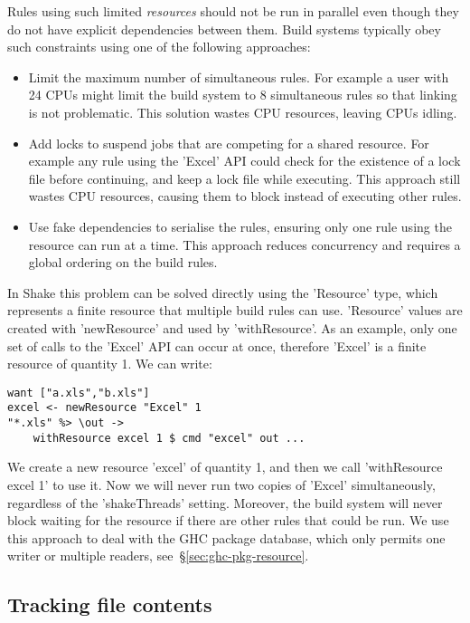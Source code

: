 \noindent Rules using such limited \emph{resources} should not be run in
parallel even though they do not have explicit dependencies between them. Build systems
typically obey such constraints using one of the following approaches:

\begin{itemize}
\item Limit the maximum number of simultaneous rules. For example a user with
24 CPUs might limit the build system to 8 simultaneous rules so that linking is
not problematic. This solution wastes CPU resources, leaving CPUs idling.
\item Add locks to suspend jobs that are competing for a shared resource. For
example any rule using the \lst'Excel' API could check for the existence of a lock
file before continuing, and keep a lock file while executing. This approach
still wastes CPU resources, causing them to block instead of executing other
rules.
\item Use fake dependencies to serialise the rules, ensuring
only one rule using the resource can run at a time. This approach reduces
concurrency and requires a global ordering on the build rules.
\end{itemize}

In Shake this problem can be solved directly using the \lst'Resource' type,
which represents a finite resource that multiple build rules can use. \lst'Resource'
values are created with \lst'newResource' and used by \lst'withResource'. As an
example, only one set of calls to the \lst'Excel' API can occur at once, therefore
\lst'Excel' is a finite resource of quantity 1. We can write:

\begin{lstlisting}
want ["a.xls","b.xls"]
excel <- newResource "Excel" 1
"*.xls" %> \out ->
    withResource excel 1 $ cmd "excel" out ...
\end{lstlisting}

\noindent We create a new resource \lst'excel' of quantity 1, and then we call
\lst'withResource excel 1' to use it. Now we will never run two copies of
\lst'Excel' simultaneously, regardless of the \lst'shakeThreads' setting.
Moreover, the build system will never block waiting for the resource if there
are other rules that could be run. We use this approach to deal with the GHC
package database, which only permits one writer or multiple readers,
see~\S\ref{sec:ghc-pkg-resource}.

\subsection{Tracking file contents\label{sec:file-contents}}

